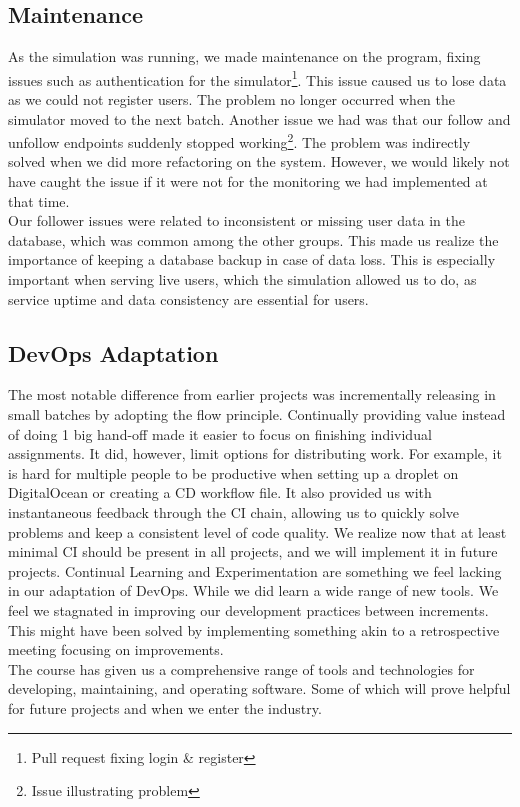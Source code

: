 \subsection{Maintenance}
As the simulation was running, we made maintenance on the program, fixing issues such as authentication for the simulator\footnote{Pull request fixing login \& register\cite{loginIssue}}.
This issue caused us to lose data as we could not register users. The problem no longer occurred when the simulator moved to the next batch.
Another issue we had was that our follow and unfollow endpoints suddenly stopped working\footnote{Issue illustrating problem\cite{issue172}}. The problem was indirectly solved when we did more refactoring on the system. However, we would likely not have caught the issue if it were not for the monitoring we had implemented at that time.\\
Our follower issues were related to inconsistent or missing user data in the database, which was common among the other groups. This made us realize the importance of keeping a database backup in case of data loss. This is especially important when serving live users, which the simulation allowed us to do, as service uptime and data consistency are essential for users.

\subsection{DevOps Adaptation}
The most notable difference from earlier projects was incrementally releasing in small batches by adopting the flow principle. Continually providing value instead of doing 1 big hand-off made it easier to focus on finishing individual assignments. It did, however, limit options for distributing work. For example, it is hard for multiple people to be productive when setting up a droplet on DigitalOcean or creating a CD workflow file. 
It also provided us with instantaneous feedback through the CI chain, allowing us to quickly solve problems and keep a consistent level of code quality. We realize now that at least minimal CI should be present in all projects, and we will implement it in future projects.
Continual Learning and Experimentation are something we feel lacking in our adaptation of DevOps. While we did learn a wide range of new tools. We feel we stagnated in improving our development practices between increments. This might have been solved by implementing something akin to a retrospective meeting focusing on improvements.\\
The course has given us a comprehensive range of tools and technologies for developing, maintaining, and operating software. Some of which will prove helpful for future projects and when we enter the industry.